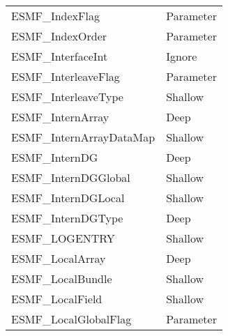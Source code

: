 \begin{table}[t]
\begin{tabular}{ll}
ESMF\_IndexFlag             & Parameter \\
ESMF\_IndexOrder            & Parameter \\
ESMF\_InterfaceInt          & Ignore\\
ESMF\_InterleaveFlag        & Parameter \\
ESMF\_InterleaveType        & Shallow\\
ESMF\_InternArray           & Deep \\
ESMF\_InternArrayDataMap    & Shallow\\
ESMF\_InternDG              & Deep \\
ESMF\_InternDGGlobal        & Shallow\\
ESMF\_InternDGLocal         & Shallow\\
ESMF\_InternDGType          & Deep \\
ESMF\_LOGENTRY              & Shallow\\
ESMF\_LocalArray            & Deep \\
ESMF\_LocalBundle           & Shallow\\
ESMF\_LocalField            & Shallow\\
ESMF\_LocalGlobalFlag       & Parameter \\ 

\end{tabular}
\end{table}

